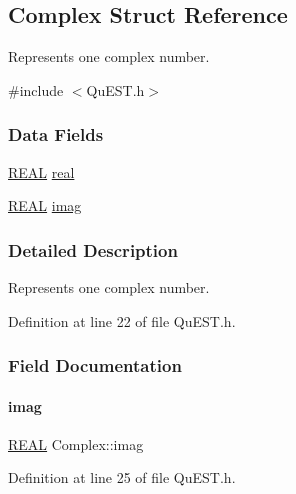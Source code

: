 \hypertarget{structComplex}{}\subsection{Complex Struct Reference}
\label{structComplex}


Represents one complex number.  




{\ttfamily \#include $<$Qu\+E\+S\+T.\+h$>$}

\subsubsection*{Data Fields}
\begin{DoxyCompactItemize}
\item 
\mbox{\hyperlink{QuEST__precision_8h_a4b654506f18b8bfd61ad2a29a7e38c25}{R\+E\+AL}} \mbox{\hyperlink{structComplex_a479ad939835457595fcca3ca55c06283}{real}}
\item 
\mbox{\hyperlink{QuEST__precision_8h_a4b654506f18b8bfd61ad2a29a7e38c25}{R\+E\+AL}} \mbox{\hyperlink{structComplex_a1151948284b21c0052f203f23ab931d9}{imag}}
\end{DoxyCompactItemize}


\subsubsection{Detailed Description}
Represents one complex number. 

Definition at line 22 of file Qu\+E\+S\+T.\+h.



\subsubsection{Field Documentation}
\mbox{\label{structComplex_a1151948284b21c0052f203f23ab931d9}} 
\paragraph{\texorpdfstring{imag}{imag}}
{\footnotesize\ttfamily \mbox{\hyperlink{QuEST__precision_8h_a4b654506f18b8bfd61ad2a29a7e38c25}{R\+E\+AL}} Complex\+::imag}



Definition at line 25 of file Qu\+E\+S\+T.\+h.



